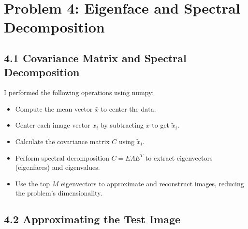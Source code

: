 \documentclass[12pt]{article}
\begin{document}
\section*{Problem 4: Eigenface and Spectral Decomposition}

\subsection*{4.1 Covariance Matrix and Spectral Decomposition}
I performed the following operations using numpy:
\begin{itemize}
    \item Compute the mean vector \( \bar{x} \) to center the data.
    \item Center each image vector \( x_i \) by subtracting \( \bar{x} \) to get \( \tilde{x}_i \).
    \item Calculate the covariance matrix \( C \) using \( \tilde{x}_i \).
    \item Perform spectral decomposition \( C = E \Lambda E^T \) to extract eigenvectors (eigenfaces) and eigenvalues.
    \item Use the top \( M \) eigenvectors to approximate and reconstruct images, reducing the problem’s dimensionality.
\end{itemize}

\subsection*{4.2 Approximating the Test Image}
\end{document}
